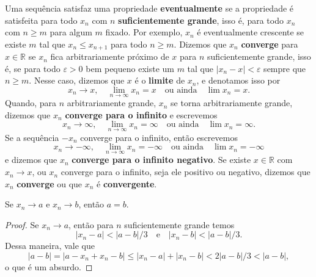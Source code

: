 Uma sequência satisfaz uma propriedade \textbf{eventualmente} se a propriedade é satisfeita para todo $x_n$ com $n$ \textbf{suficientemente grande}, isso é, para todo $x_n$ com $n \geq m$ para algum $m$ fixado. Por exemplo, $x_n$ é eventualmente crescente se existe $m$ tal que $x_n \leq x_{n+1}$ para todo $n \geq m$. Dizemos que $x_n$ \textbf{converge} para $x \in \mathbb{R}$ se $x_n$ fica arbitrariamente próximo de $x$ para $n$ suficientemente grande, isso é, se para todo $\varepsilon > 0$ bem pequeno existe um $m$ tal que $|x_n - x| < \varepsilon$ sempre que $n \geq m$. Nesse caso, dizemos que $x$ é o \textbf{limite} de $x_n$, e denotamos isso por \begin{equation}
    x_n \to x, \quad \lim_{n \to \infty} x_n = x \quad \text{ou ainda} \quad \lim x_n = x.
\end{equation} Quando, para $n$ arbitrariamente grande, $x_n$ se torna arbitrariamente grande, dizemos que $x_n$ \textbf{converge para o infinito} e escrevemos \begin{equation}
    x_n \to \infty, \quad \lim_{n \to \infty} x_n = \infty \quad \text{ou ainda} \quad \lim x_n = \infty.
\end{equation} Se a sequência $-x_n$ converge para o infinito, então escrevemos \begin{equation}
    x_n \to -\infty, \quad \lim_{n \to \infty} x_n = -\infty \quad \text{ou ainda} \quad \lim x_n = -\infty
\end{equation} e dizemos que $x_n$ \textbf{converge para o infinito negativo}. Se existe $x \in \mathbb{R}$ com $x_n \to x$, ou $x_n$ converge para o infinito, seja ele positivo ou negativo, dizemos que $x_n$ \textbf{converge} ou que $x_n$ é \textbf{convergente}.

\begin{theorem}
    Se $x_n \to a$ e $x_n \to b$, então $a = b$.
\end{theorem}
\begin{proof}
    Se $x_n \to a$, então para $n$ suficientemente grande temos \begin{equation}
        |x_n - a| < |a - b|/3 \quad \text{e} \quad |x_n - b| < |a - b|/3.
    \end{equation} Dessa maneira, vale que \begin{equation}
        |a - b| = |a - x_n + x_n - b| \leq |x_n - a| + |x_n - b| < 2|a - b|/3 < |a - b|,
    \end{equation} o que é um absurdo.
\end{proof}

